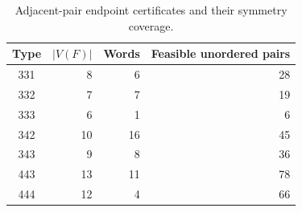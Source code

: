 \documentclass[11pt]{article}
\theoremstyle{remark}
\numberwithin{equation}{section}
\numberwithin{table}{section}
\begin{document}
\begin{table}[htbp]
\centering
\caption{Adjacent-pair endpoint certificates and their symmetry coverage.}
\label{tab:pair-five-counts}
\begin{tabular}{crrr}
\toprule
Type & $|V(F)|$ & Words & Feasible unordered pairs\\
\midrule
 331&8&6&28\\
 332&7&7&19\\
 333&6&1&6\\
 342&10&16&45\\
 343&9&8&36\\
 443&13&11&78\\
 444&12&4&66\\
\bottomrule
\end{tabular}
\end{table}
\end{document}
